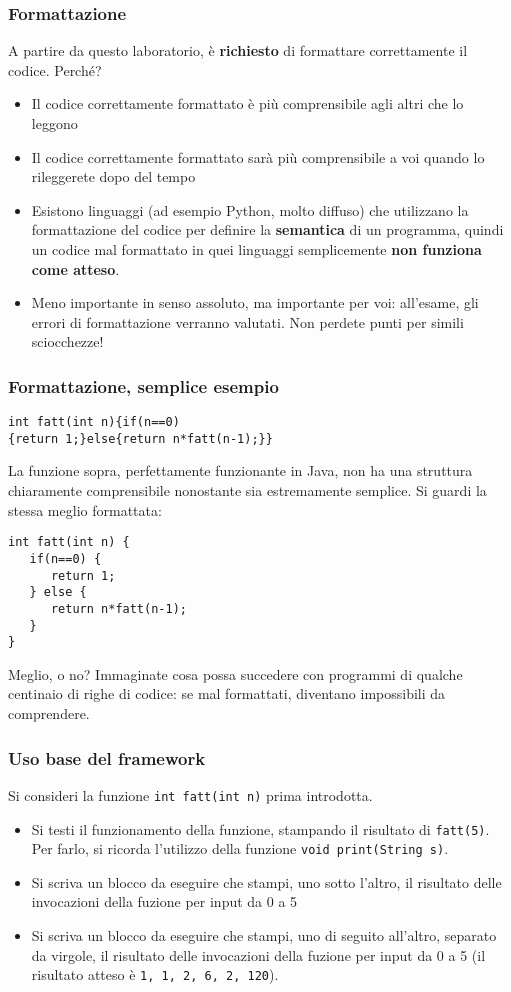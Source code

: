 \documentclass{beamer}
\begin{document}
\begin{frame}
\frametitle{Formattazione}
A partire da questo laboratorio, è \textbf{richiesto} di formattare correttamente il codice. Perché?
\begin{itemize}
 \item Il codice correttamente formattato è più comprensibile agli altri che lo leggono
 \item Il codice correttamente formattato sarà più comprensibile a voi quando lo rileggerete dopo del tempo
 \item Esistono linguaggi (ad esempio Python, molto diffuso) che utilizzano la formattazione del codice per definire la \textbf{semantica} di un programma, quindi un codice mal formattato in quei linguaggi semplicemente \textbf{non funziona come atteso}.
 \item Meno importante in senso assoluto, ma importante per voi: all'esame, gli errori di formattazione verranno valutati. Non perdete punti per simili sciocchezze!
\end{itemize}
\end{frame}

\begin{frame}[fragile]
\frametitle{Formattazione, semplice esempio}
\begin{verbatim}
int fatt(int n){if(n==0)
{return 1;}else{return n*fatt(n-1);}}
\end{verbatim}
La funzione sopra, perfettamente funzionante in Java, non ha una struttura chiaramente comprensibile nonostante sia estremamente semplice. Si guardi la stessa meglio formattata:
\begin{verbatim}
int fatt(int n) {
   if(n==0) {
      return 1;
   } else {
      return n*fatt(n-1);
   }
}
\end{verbatim}
Meglio, o no? Immaginate cosa possa succedere con programmi di qualche centinaio di righe di codice: se mal formattati, diventano impossibili da comprendere.
\end{frame}

\begin{frame}
\frametitle{Uso base del framework}
Si consideri la funzione \texttt{int fatt(int n)} prima introdotta.
\begin{itemize}
 \item Si testi il funzionamento della funzione, stampando il risultato di \texttt{fatt(5)}. Per farlo, si ricorda l'utilizzo della funzione \texttt{void print(String s)}.
 \item Si scriva un blocco da eseguire che stampi, uno sotto l'altro, il risultato delle invocazioni della fuzione per input da 0 a 5
 \item Si scriva un blocco da eseguire che stampi, uno di seguito all'altro, separato da virgole, il risultato delle invocazioni della fuzione per input da 0 a 5 (il risultato atteso è \texttt{1, 1, 2, 6, 2, 120}).
\end{itemize}
\end{frame}
\end{document}
